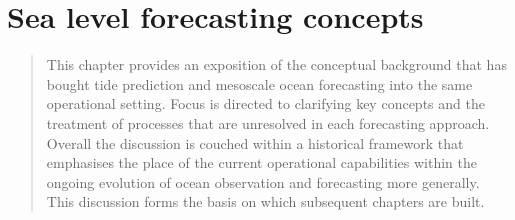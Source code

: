 \chapter{Sea level forecasting concepts}
\begin{quote}
{\small
This chapter provides an exposition of the conceptual background that has bought tide prediction and mesoscale ocean forecasting into the same operational setting.
Focus is directed to clarifying key concepts and the treatment of processes that are unresolved in each forecasting approach.   
Overall the discussion is couched within a historical framework that emphasises the place of the current operational capabilities within the ongoing evolution of ocean observation and forecasting more generally.
This discussion forms the basis on which subsequent chapters are built.
}
\end{quote}


\label{chp:forecastConcepts}




